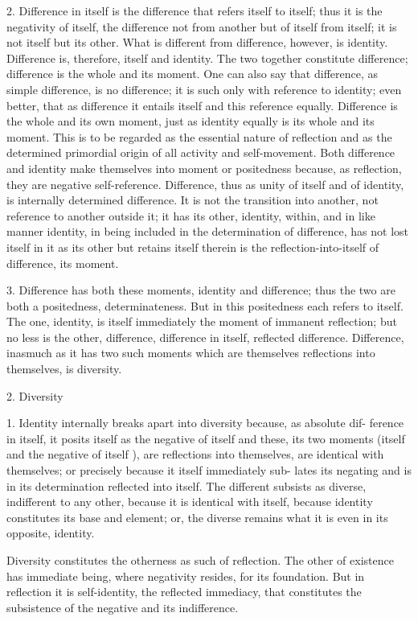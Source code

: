 2. Difference in itself is the difference
that refers itself to itself;
thus it is the negativity of itself,
the difference not from another
but of itself from itself;
it is not itself but its other.
What is different from difference, however, is identity.
Difference is, therefore, itself and identity.
The two together constitute difference;
difference is the whole and its moment.
One can also say that difference,
as simple difference, is no difference;
it is such only with reference to identity;
even better, that as difference it entails
itself and this reference equally.
Difference is the whole and its own moment,
just as identity equally is its whole and its moment.
This is to be regarded as
the essential nature of reflection
and as the determined primordial origin
of all activity and self-movement.
Both difference and identity make themselves
into moment or positedness
because, as reflection, they are negative self-reference.
Difference, thus as unity of itself and of identity,
is internally determined difference.
It is not the transition into another,
not reference to another outside it;
it has its other, identity, within,
and in like manner identity,
in being included in the determination of difference,
has not lost itself in it as its other
but retains itself therein is
the reflection-into-itself of difference, its moment.

3. Difference has both these moments, identity and difference;
thus the two are both a positedness, determinateness.
But in this positedness each refers to itself.
The one, identity, is itself immediately
the moment of immanent reflection;
but no less is the other, difference,
difference in itself, reflected difference.
Difference, inasmuch as it has two such moments
which are themselves reflections into themselves,
is diversity.

2. Diversity

1. Identity internally breaks apart into diversity because, as absolute dif-
ference in itself, it posits itself as the negative of itself and these, its two
moments (itself and the negative of itself ), are reflections into themselves,
are identical with themselves; or precisely because it itself immediately sub-
lates its negating and is in its determination reflected into itself. The different
subsists as diverse, indifferent to any other, because it is identical with itself,
because identity constitutes its base and element; or, the diverse remains
what it is even in its opposite, identity.

Diversity constitutes the otherness as such of reflection. The other of
existence has immediate being, where negativity resides, for its foundation.
But in reflection it is self-identity, the reflected immediacy, that constitutes
the subsistence of the negative and its indifference.

